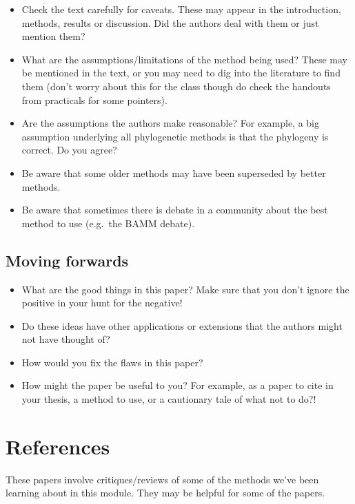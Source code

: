 \documentclass[]{book}
\theoremstyle{definition}
\theoremstyle{definition}
\theoremstyle{definition}
\theoremstyle{remark}
\begin{document}
\begin{itemize}
\item
  Check the text carefully for caveats. These may appear in the
  introduction, methods, results or discussion. Did the authors deal
  with them or just mention them?
\item
  What are the assumptions/limitations of the method being used? These
  may be mentioned in the text, or you may need to dig into the
  literature to find them (don't worry about this for the class though
  do check the handouts from practicals for some pointers).
\item
  Are the assumptions the authors make reasonable? For example, a big
  assumption underlying all phylogenetic methods is that the phylogeny
  is correct. Do you agree?
\item
  Be aware that some older methods may have been superseded by better
  methods.
\item
  Be aware that sometimes there is debate in a community about the best
  method to use (e.g.~the BAMM debate).
\end{itemize}

\subsection{Moving forwards}\label{moving-forwards}

\begin{itemize}
\item
  What are the good things in this paper? Make sure that you don't
  ignore the positive in your hunt for the negative!
\item
  Do these ideas have other applications or extensions that the authors
  might not have thought of?
\item
  How would you fix the flaws in this paper?
\item
  How might the paper be useful to you? For example, as a paper to cite
  in your thesis, a method to use, or a cautionary tale of what not to
  do?!
\end{itemize}

\section{References}\label{references-6}

These papers involve critiques/reviews of some of the methods we've been
learning about in this module. They may be helpful for some of the
papers.
\end{document}
